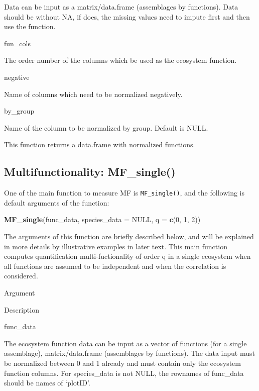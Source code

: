 \documentclass[
]{article}
\newenvironment{Shaded}{\begin{snugshade}}{\end{snugshade}}
\newcommand{\AttributeTok}[1]{\textcolor[rgb]{0.13,0.29,0.53}{#1}}
\newcommand{\ConstantTok}[1]{\textcolor[rgb]{0.56,0.35,0.01}{#1}}
\newcommand{\DecValTok}[1]{\textcolor[rgb]{0.00,0.00,0.81}{#1}}
\newcommand{\FunctionTok}[1]{\textcolor[rgb]{0.13,0.29,0.53}{\textbf{#1}}}
\newcommand{\NormalTok}[1]{#1}
\begin{document}
Data can be input as a matrix/data.frame (assemblages by functions).
Data should be without NA, if does, the missing values need to impute
first and then use the function.

fun\_cols

The order number of the columns which be used as the ecosystem function.

negative

Name of columns which need to be normalized negatively.

by\_group

Name of the column to be normalized by group. Default is NULL.

This function returns a data.frame with normalized functions.

\hypertarget{multifunctionality-mf_single}{%
\subsection{Multifunctionality:
MF\_single()}\label{multifunctionality-mf_single}}

One of the main function to measure MF is \texttt{MF\_single()}, and the
following is default arguments of the function:

\begin{Shaded}
\begin{Highlighting}[]
\FunctionTok{MF\_single}\NormalTok{(func\_data, }\AttributeTok{species\_data =} \ConstantTok{NULL}\NormalTok{, }\AttributeTok{q =} \FunctionTok{c}\NormalTok{(}\DecValTok{0}\NormalTok{, }\DecValTok{1}\NormalTok{, }\DecValTok{2}\NormalTok{))}
\end{Highlighting}
\end{Shaded}

The arguments of this function are briefly described below, and will be
explained in more details by illustrative examples in later text. This
main function computes quantification multi-fuctionality of order q in a
single ecosystem when all functions are assumed to be independent and
when the correlation is considered.

Argument

Description

func\_data

The ecosystem function data can be input as a vector of functions (for a
single assemblage), matrix/data.frame (assemblages by functions). The
data input must be normalized between 0 and 1 already and must contain
only the ecosystem function columns. For species\_data is not NULL, the
rownames of func\_data should be names of `plotID'.
\end{document}
